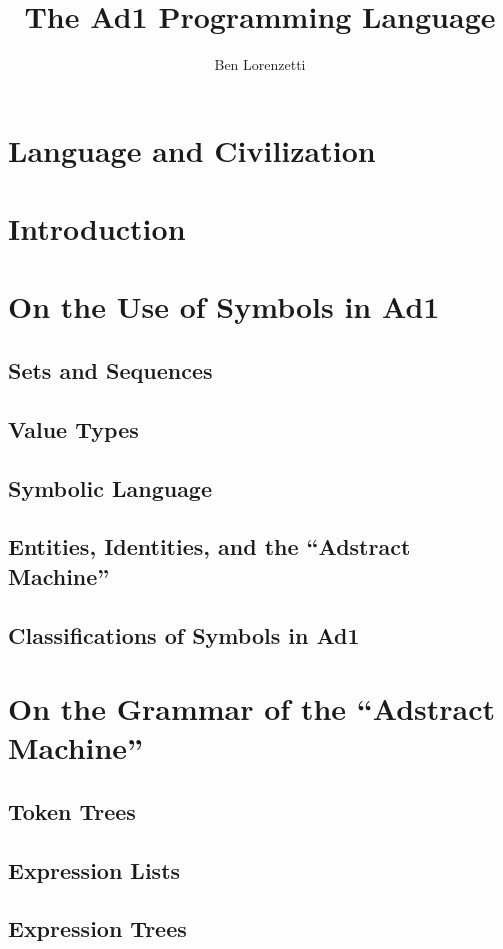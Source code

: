 \documentclass[11pt]{book}
\begin{document}
\title{The Ad1 Programming Language}
\author{Ben Lorenzetti}
\maketitle
\tableofcontents

\chapter[Preface]{Language and Civilization}


\chapter{Introduction}

\chapter{On the Use of Symbols in Ad1}
\section{Sets and Sequences}
\section{Value Types}
\section{Symbolic Language}
\section{Entities, Identities, and the ``Adstract Machine''}
\section{Classifications of Symbols in Ad1}

\chapter{On the Grammar of the ``Adstract Machine''}
\section{Token Trees}
\section{Expression Lists}
\section{Expression Trees}
\end{document}
